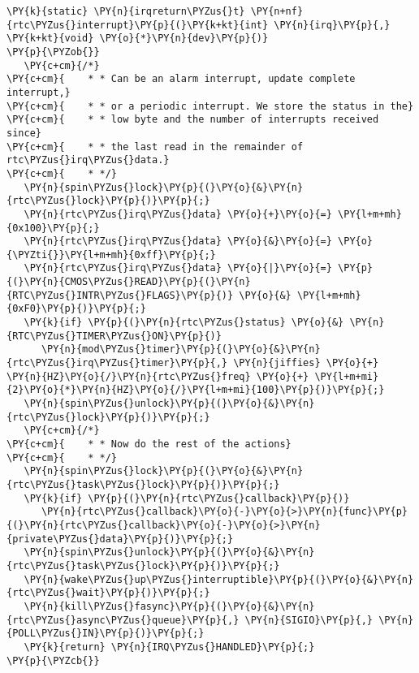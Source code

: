 \begin{Verbatim}[commandchars=\\\{\}]
\PY{k}{static} \PY{n}{irqreturn\PYZus{}t} \PY{n+nf}{rtc\PYZus{}interrupt}\PY{p}{(}\PY{k+kt}{int} \PY{n}{irq}\PY{p}{,} \PY{k+kt}{void} \PY{o}{*}\PY{n}{dev}\PY{p}{)}
\PY{p}{\PYZob{}}
   \PY{c+cm}{/*}
\PY{c+cm}{    * * Can be an alarm interrupt, update complete interrupt,}
\PY{c+cm}{    * * or a periodic interrupt. We store the status in the}
\PY{c+cm}{    * * low byte and the number of interrupts received since}
\PY{c+cm}{    * * the last read in the remainder of rtc\PYZus{}irq\PYZus{}data.}
\PY{c+cm}{    * */}
   \PY{n}{spin\PYZus{}lock}\PY{p}{(}\PY{o}{&}\PY{n}{rtc\PYZus{}lock}\PY{p}{)}\PY{p}{;}
   \PY{n}{rtc\PYZus{}irq\PYZus{}data} \PY{o}{+}\PY{o}{=} \PY{l+m+mh}{0x100}\PY{p}{;}
   \PY{n}{rtc\PYZus{}irq\PYZus{}data} \PY{o}{&}\PY{o}{=} \PY{o}{\PYZti{}}\PY{l+m+mh}{0xff}\PY{p}{;}
   \PY{n}{rtc\PYZus{}irq\PYZus{}data} \PY{o}{|}\PY{o}{=} \PY{p}{(}\PY{n}{CMOS\PYZus{}READ}\PY{p}{(}\PY{n}{RTC\PYZus{}INTR\PYZus{}FLAGS}\PY{p}{)} \PY{o}{&} \PY{l+m+mh}{0xF0}\PY{p}{)}\PY{p}{;}
   \PY{k}{if} \PY{p}{(}\PY{n}{rtc\PYZus{}status} \PY{o}{&} \PY{n}{RTC\PYZus{}TIMER\PYZus{}ON}\PY{p}{)}
      \PY{n}{mod\PYZus{}timer}\PY{p}{(}\PY{o}{&}\PY{n}{rtc\PYZus{}irq\PYZus{}timer}\PY{p}{,} \PY{n}{jiffies} \PY{o}{+} \PY{n}{HZ}\PY{o}{/}\PY{n}{rtc\PYZus{}freq} \PY{o}{+} \PY{l+m+mi}{2}\PY{o}{*}\PY{n}{HZ}\PY{o}{/}\PY{l+m+mi}{100}\PY{p}{)}\PY{p}{;}
   \PY{n}{spin\PYZus{}unlock}\PY{p}{(}\PY{o}{&}\PY{n}{rtc\PYZus{}lock}\PY{p}{)}\PY{p}{;}
   \PY{c+cm}{/*}
\PY{c+cm}{    * * Now do the rest of the actions}
\PY{c+cm}{    * */}
   \PY{n}{spin\PYZus{}lock}\PY{p}{(}\PY{o}{&}\PY{n}{rtc\PYZus{}task\PYZus{}lock}\PY{p}{)}\PY{p}{;}
   \PY{k}{if} \PY{p}{(}\PY{n}{rtc\PYZus{}callback}\PY{p}{)}
      \PY{n}{rtc\PYZus{}callback}\PY{o}{-}\PY{o}{>}\PY{n}{func}\PY{p}{(}\PY{n}{rtc\PYZus{}callback}\PY{o}{-}\PY{o}{>}\PY{n}{private\PYZus{}data}\PY{p}{)}\PY{p}{;}
   \PY{n}{spin\PYZus{}unlock}\PY{p}{(}\PY{o}{&}\PY{n}{rtc\PYZus{}task\PYZus{}lock}\PY{p}{)}\PY{p}{;}
   \PY{n}{wake\PYZus{}up\PYZus{}interruptible}\PY{p}{(}\PY{o}{&}\PY{n}{rtc\PYZus{}wait}\PY{p}{)}\PY{p}{;}
   \PY{n}{kill\PYZus{}fasync}\PY{p}{(}\PY{o}{&}\PY{n}{rtc\PYZus{}async\PYZus{}queue}\PY{p}{,} \PY{n}{SIGIO}\PY{p}{,} \PY{n}{POLL\PYZus{}IN}\PY{p}{)}\PY{p}{;}
   \PY{k}{return} \PY{n}{IRQ\PYZus{}HANDLED}\PY{p}{;}
\PY{p}{\PYZcb{}}
\end{Verbatim}
